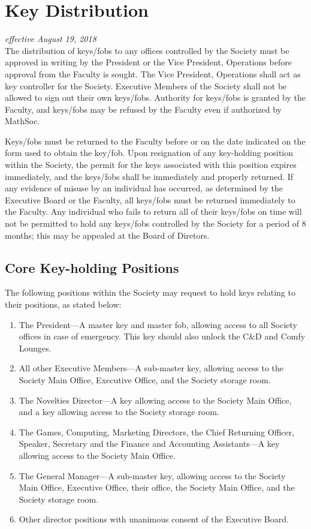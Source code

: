 \section{Key Distribution}
\emph{effective August 19, 2018}\\

The distribution of keys/fobs to any offices controlled by the Society must be
approved in writing by the President or the Vice President, Operations before
approval from the Faculty is sought. The Vice President, Operations shall act
as key controller for the Society. Executive Members of the Society shall not
be allowed to sign out their own keys/fobs. Authority for keys/fobs is granted
by the Faculty, and keys/fobs may be refused by the Faculty even if authorized
by MathSoc.

Keys/fobs must be returned to the Faculty before or on the date indicated on
the form used to obtain the key/fob. Upon resignation of any key-holding
position within the Society, the permit for the keys associated with this
position expires immediately, and the keys/fobs shall be immediately and
properly returned. If any evidence of misuse by an individual has occurred, as
determined by the Executive Board or the Faculty, all keys/fobs must be
returned immediately to the Faculty. Any individual who fails to return all of
their keys/fobs on time will not be permitted to hold any keys/fobs controlled
by the Society for a period of 8 months; this may be appealed at the Board of 
Diretors.

\subsection{Core Key-holding Positions}
The following positions within the Society may request to hold keys relating to
their positions, as stated below:
\begin{enumerate}
    \item The President---A master key and master fob, allowing access to all
        Society offices in case of emergency. This key should also unlock the C\&D
        and Comfy Lounges.
    \item All other Executive Members---A sub-master key, allowing access to the
        Society Main Office, Executive Office, and the Society storage room.
    \item The Novelties Director---A key allowing access to the Society Main
        Office, and a key allowing access to the Society storage room.
    \item The Games, Computing, Marketing Directors, the Chief Returning Officer,
        Speaker, Secretary and the Finance and Accounting Assistants---A key
        allowing access to the Society Main Office.
    \item The General Manager---A sub-master key, allowing access to the Society
        Main Office, Executive Office, their office, the Society Main Office, and
        the Society storage room.
    \item Other director positions with unanimous consent of the
        Executive Board.
\end{enumerate}

